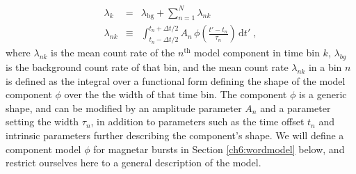 \documentclass[12pt]{emulateapj}
\newcommand{\given}{\,|\,}
\newcommand{\dd}{\mathrm{d}}
\newcommand{\counts}{y}
\newcommand{\pars}{\theta}
\newcommand{\mean}{\lambda}
\newcommand{\Poisson}{{\mathcal P}}
\newcommand{\bg}{\mathrm{bg}}
\newcommand{\word}{\phi}
\begin{document}
\begin{eqnarray}
\mean_k &=& \mean_{\bg} + \sum_{n=1}^N \mean_{nk}
\\
\mean_{nk} &\equiv& \int_{t_n-\Delta t/2}^{t_n+\Delta t/2} A_n\,\word\left(\frac{t'-t_n}{\tau_n}\right)\,\dd t' \; ,
\end{eqnarray}
where $\mean_{nk}$ is the mean count rate of the $n^{\mathrm{th}}$ model component in time bin $k$, 
$\mean_{bg}$ is the background count rate of that bin,
and the mean count rate $\mean_{nk}$ in a bin $n$ is defined as the integral over a functional form defining the shape of
the model component $\word$ over the the width of that time bin. The component $\word$ is a generic shape,
and can be modified by an amplitude parameter $A_n$ and a parameter setting the width $\tau_n$, in addition to
parameters such as the time offset $t_n$ and intrinsic parameters further describing the component's shape.
We will define a component model $\word$ for magnetar bursts in Section \ref{ch6:wordmodel} below, and
restrict ourselves here to a general description of the model.
 
\end{document}
